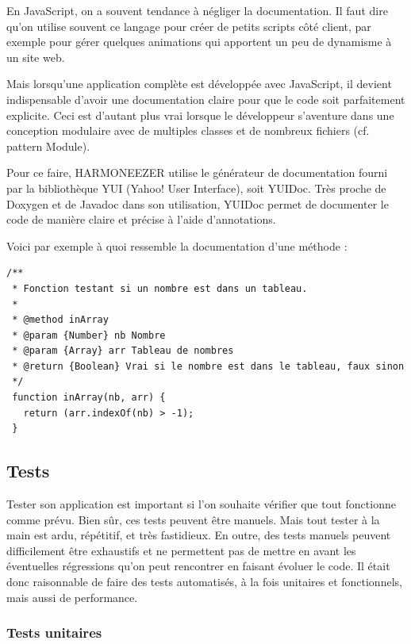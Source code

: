 \documentclass[a4paper,12pt]{article}
\begin{document}
En JavaScript, on a souvent tendance à négliger la documentation. Il faut dire qu'on utilise souvent ce langage pour créer de petits scripts côté client, par exemple pour gérer quelques animations qui apportent un peu de dynamisme à un site web.

Mais lorsqu'une application complète est développée avec JavaScript, il devient indispensable d'avoir une documentation claire pour que le code soit parfaitement explicite. Ceci est d'autant plus vrai lorsque le développeur s'aventure dans une conception modulaire avec de multiples classes et de nombreux fichiers (cf. pattern Module).

Pour ce faire, HARMONEEZER utilise le générateur de documentation fourni par la bibliothèque YUI (Yahoo! User Interface), soit YUIDoc. Très proche de Doxygen et de Javadoc dans son utilisation, YUIDoc permet de documenter le code de manière claire et précise à l'aide d'annotations.

Voici par exemple à quoi ressemble la documentation d'une méthode :

\vspace{7pt}

\begin{lstlisting}
/**
 * Fonction testant si un nombre est dans un tableau.
 *
 * @method inArray
 * @param {Number} nb Nombre
 * @param {Array} arr Tableau de nombres
 * @return {Boolean} Vrai si le nombre est dans le tableau, faux sinon
 */
 function inArray(nb, arr) {
   return (arr.indexOf(nb) > -1);
 }
\end{lstlisting}

\newpage

\subsection{Tests}

Tester son application est important si l'on souhaite vérifier que tout fonctionne comme prévu. Bien sûr, ces tests peuvent être manuels. Mais tout tester à la main est ardu, répétitif, et très fastidieux. En outre, des tests manuels peuvent difficilement être exhaustifs et ne permettent pas de mettre en avant les éventuelles régressions qu'on peut rencontrer en faisant évoluer le code. Il était donc raisonnable de faire des tests automatisés, à la fois unitaires et fonctionnels, mais aussi de performance.

\subsubsection{Tests unitaires}
\end{document}
